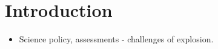 \section{Introduction}

\begin{itemize}
	

	\item Science policy, assessments - challenges of explosion.
    
	
\end{itemize}